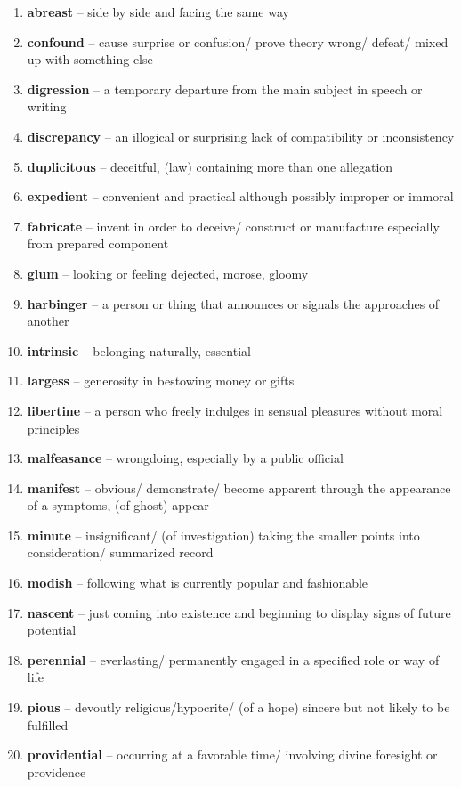 \begin{enumerate}[wide,labelindent=0pt]
\item \textbf{abreast} -- side by side and facing the same way
\item \textbf{confound} -- cause surprise or confusion/ prove theory wrong/ defeat/ mixed up with something else
\item \textbf{digression} -- a temporary departure from the main subject in speech or writing
\item \textbf{discrepancy} -- an illogical or surprising lack of compatibility or inconsistency
\item \textbf{duplicitous} -- deceitful, (law) containing more than one allegation
\item \textbf{expedient} -- convenient and practical although possibly improper or immoral
\item \textbf{fabricate} -- invent in order to deceive/ construct or manufacture especially from prepared component
\item \textbf{glum} -- looking or feeling dejected, morose, gloomy
\item \textbf{harbinger} -- a person or thing that announces or signals the approaches of another
\item \textbf{intrinsic} -- belonging naturally, essential
\item \textbf{largess} -- generosity in bestowing money or gifts
\item \textbf{libertine} -- a person who freely indulges in sensual pleasures without moral principles
\item \textbf{malfeasance} -- wrongdoing, especially by a public official
\item \textbf{manifest} -- obvious/ demonstrate/ become apparent through the appearance of a symptoms, (of ghost) appear
\item \textbf{minute} -- insignificant/ (of investigation) taking the smaller points into consideration/ summarized record
\item \textbf{modish} -- following what is currently popular and fashionable
\item \textbf{nascent} -- just coming into existence and beginning to display signs of future potential
\item \textbf{perennial} -- everlasting/ permanently engaged in a specified role or way of life
\item \textbf{pious} -- devoutly religious/hypocrite/ (of a hope) sincere but not likely to be fulfilled
\item \textbf{providential} -- occurring at a favorable time/ involving divine foresight or providence

\end{enumerate}

